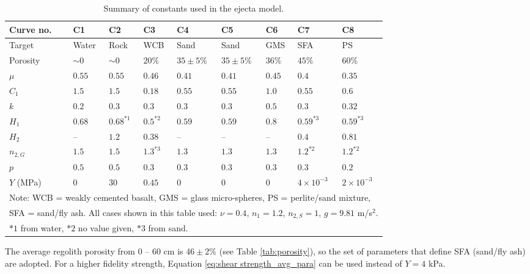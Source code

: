 \documentclass{article}
\begin{document}
\begin{table}[!htb]
	\begin{center}
		\caption{Summary of constants used in the \cite{housen2011ejecta} ejecta model.}
		\label{tab:scaling law parameters}
		\begin{tabular}{l l l l l l l l l}
			\hline
			Curve no.\ & C1    & C2   & C3  & C4   & C5   & C6  & C7  & C8  \\
			\hline
			Target     & Water & Rock & WCB & Sand & Sand & GMS & SFA & PS\\
			Porosity   & $\sim 0$ & $\sim 0$ & $20\%$ & $35\pm 5\%$ & $35\pm 5\%$ & $36\%$ & $45\%$ & $60\%$\\
			$\mu$ & $0.55$ & $0.55$ & $0.46$ & $0.41$ & $0.41$ & $0.45$ & $0.4$ & $0.35$\\
			$C_1$ & $1.5$ & $1.5$ & $0.18$ & $0.55$ & $0.55$ & $1.0$ & $0.55$ & $0.6$ \\
			$k$ & $0.2$ & $0.3$ & $0.3$ & $0.3$ & $0.3$ & $0.5$ & $0.3$ & $0.32$\\ 
			$H_1$ & $0.68$ & $0.68^{*1}$ & $0.5^{*2}$ & $0.59$ & $0.59$ & $0.8$ & $0.59^{*3}$ & $0.59^{*3}$\\
			$H_2$ & -- & $1.2$ & $0.38$ & -- & -- & -- & $0.4$ & $0.81$\\
			$n_{2,G}$ & $1.5$ & $1.5$ & $1.3^{*3}$ & $1.3$ & $1.3$ & $1.3$ & $1.2^{*2}$ & $1.2^{*2}$\\
			$p$ & $0.5$ & $0.5$ & $0.3$ & $0.3$ & $0.3$ & $0.3$ & $0.3$ & $0.2$\\
			$Y$ (MPa) & $0$ & $30$ & $0.45$ & $0$ & $0$ & $0$ & $4\times 10^{-3}$ & $2\times 10^{-3}$\\
			\hline
			\multicolumn{9}{l}{\footnotesize Note: WCB = weakly cemented basalt, GMS = glass micro-spheres, PS = perlite/sand mixture,} \\
			\multicolumn{9}{l}{\footnotesize SFA = sand/fly ash. All cases shown in this table used: $\nu=0.4$, $n_1=1.2$, $n_{2,S} = 1$, $g=9.81$ m/s$^2$.} \\
			\multicolumn{9}{l}{\footnotesize $*1$ from water, $*2$ no value given, $*3$ from sand.}\\
			
		\end{tabular}
	\end{center}
\end{table}

The average regolith porosity from $0$ -- $60$ cm is $46\pm 2 \%$ (see Table \ref{tab:porosity}), so the set of parameters that define SFA (sand/fly ash) are adopted. For a higher fidelity strength, Equation \eqref{eq:shear strength_avg_para} can be used instead of $Y = 4$ kPa.
\end{document}
